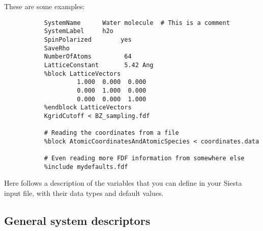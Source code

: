 \documentclass[11pt]{article}
\begin{document}
\noindent
These are some examples:

\begin{verbatim}
           SystemName      Water molecule  # This is a comment 
           SystemLabel     h2o
           SpinPolarized        yes 
           SaveRho                 
           NumberOfAtoms         64  
           LatticeConstant       5.42 Ang  
           %block LatticeVectors  
                    1.000  0.000  0.000 
                    0.000  1.000  0.000 
                    0.000  0.000  1.000
           %endblock LatticeVectors  
           KgridCutoff < BZ_sampling.fdf 

           # Reading the coordinates from a file 
           %block AtomicCoordinatesAndAtomicSpecies < coordinates.data 

           # Even reading more FDF information from somewhere else
           %include mydefaults.fdf  
\end{verbatim}

Here follows a description of the variables that you can
define in your {\sc Siesta} input file, with their data types and
default values.

\vspace{5pt}
\subsection{General system descriptors}
\end{document}
